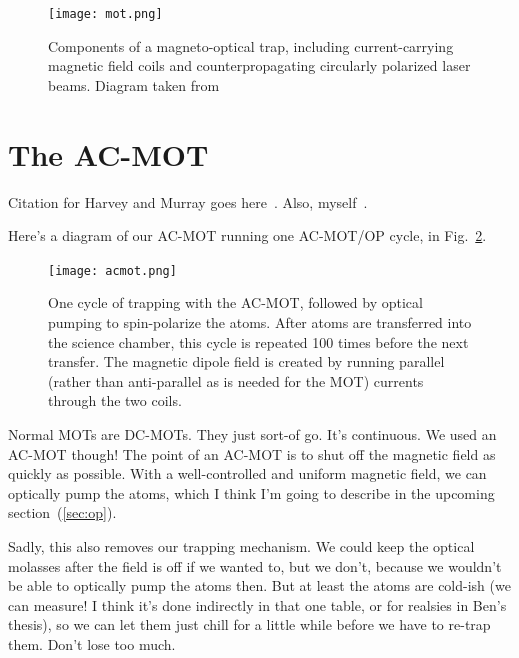\begin{figure}[h!!!!!t!]
	\centering
		\texttt{[image: mot.png]}
		\caption{Components of a magneto-optical trap, including current-carrying magnetic field coils and counterpropagating circularly polarized laser beams. Diagram taken from~\cite{thesis}}
		\label{fig:mot}
    	\label{fig:themot}
\end{figure}


\section{The AC-MOT}
\label{sec:acmot}
Citation for Harvey and Murray goes here~\cite{harveymurray}.  Also, myself~\cite{thesis}.

Here's a diagram of our AC-MOT running one AC-MOT/OP cycle, in Fig.~\ref{fig:acmot}.

\begin{figure}[ht]
	\centering
		\texttt{[image: acmot.png]}
		\caption{One cycle of trapping with the AC-MOT, followed by optical pumping to spin-polarize the atoms.  After atoms are transferred into the science chamber, this cycle is repeated 100 times before the next transfer.  The magnetic dipole field is created by running parallel (rather than anti-parallel as is needed for the MOT) currents through the two coils.}
		\label{fig:acmot}
\end{figure}


Normal MOTs are DC-MOTs.  They just sort-of go.  It's continuous.  We used an AC-MOT though!  The point of an AC-MOT is to shut off the magnetic field as quickly as possible.  With a well-controlled and uniform magnetic field, we can optically pump the atoms, which I think I'm going to describe in the upcoming section~(\ref{sec:op}).

Sadly, this also removes our trapping mechanism.  We could keep the optical molasses after the field is off if we wanted to, but we don't, because we wouldn't be able to optically pump the atoms then.  But at least the atoms are cold-ish (we can measure!  I think it's done indirectly in that one table, or for realsies in Ben's thesis), so we can let them just chill for a little while before we have to re-trap them.  Don't lose too much.  

